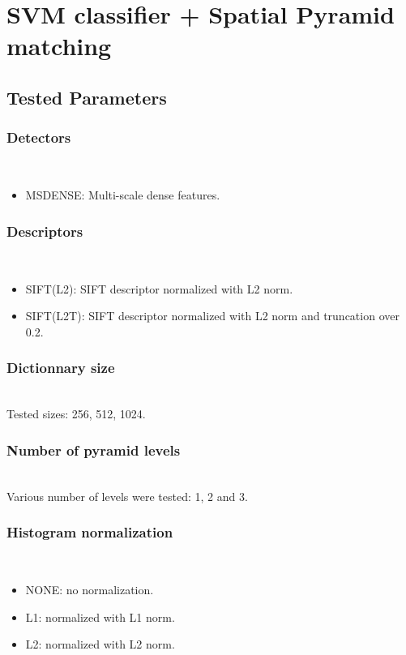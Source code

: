 \documentclass[10pt,a4paper]{llncs}
\begin{document}
\newpage
\section{SVM classifier + Spatial Pyramid matching}
\subsection{Tested Parameters}

\subsubsection{Detectors}$~$\\
\begin{itemize}
\item MSDENSE: Multi-scale dense features.
\end{itemize}

\subsubsection{Descriptors}$~$\\
\begin{itemize}
\item SIFT(L2): SIFT descriptor normalized with L2 norm.
\item SIFT(L2T): SIFT descriptor normalized with L2 norm and truncation over 0.2.
\end{itemize}

\subsubsection{Dictionnary size}$~$\\
Tested sizes: 256, 512, 1024.

\subsubsection{Number of pyramid levels}$~$\\
Various number of levels were tested: 1, 2 and 3.

\subsubsection{Histogram normalization}$~$\\
\begin{itemize}
\item NONE: no normalization.
\item L1: normalized with L1 norm.
\item L2: normalized with L2 norm.
\end{itemize}
\end{document}
